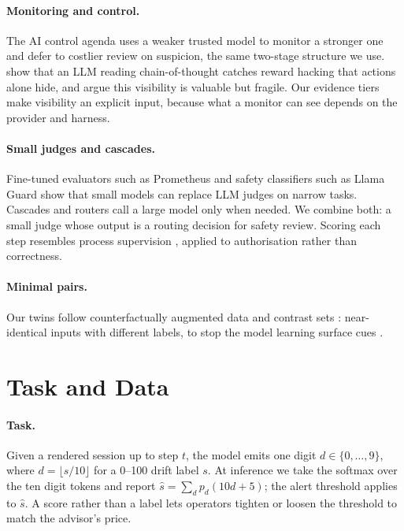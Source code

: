 \documentclass[11pt]{article}
\begin{document}
\paragraph{Monitoring and control.} The AI control agenda \citep{greenblatt2024control} uses a weaker trusted model to monitor a stronger one and defer to costlier review on suspicion, the same two-stage structure we use. \citet{baker2025monitoring} show that an LLM reading chain-of-thought catches reward hacking that actions alone hide, and \citet{korbak2025cot} argue this visibility is valuable but fragile. Our evidence tiers make visibility an explicit input, because what a monitor can see depends on the provider and harness.

\paragraph{Small judges and cascades.} Fine-tuned evaluators such as Prometheus \citep{kim2024prometheus} and safety classifiers such as Llama Guard \citep{inan2023llamaguard} show that small models can replace LLM judges \citep{zheng2023judging} on narrow tasks. Cascades and routers \citep{chen2023frugalgpt,ong2024routellm} call a large model only when needed. We combine both: a small judge whose output is a routing decision for safety review. Scoring each step resembles process supervision \citep{lightman2024verify}, applied to authorisation rather than correctness.

\paragraph{Minimal pairs.} Our twins follow counterfactually augmented data \citep{kaushik2020cad} and contrast sets \citep{gardner2020contrast}: near-identical inputs with different labels, to stop the model learning surface cues \citep{geirhos2020shortcut}.

\section{Task and Data}\label{sec:data}

\paragraph{Task.} Given a rendered session up to step $t$, the model emits one digit $d\in\{0,\dots,9\}$, where $d=\lfloor s/10\rfloor$ for a 0--100 drift label $s$. At inference we take the softmax over the ten digit tokens and report $\hat{s}=\sum_d p_d(10d+5)$; the alert threshold applies to $\hat{s}$. A score rather than a label lets operators tighten or loosen the threshold to match the advisor's price.
\end{document}
